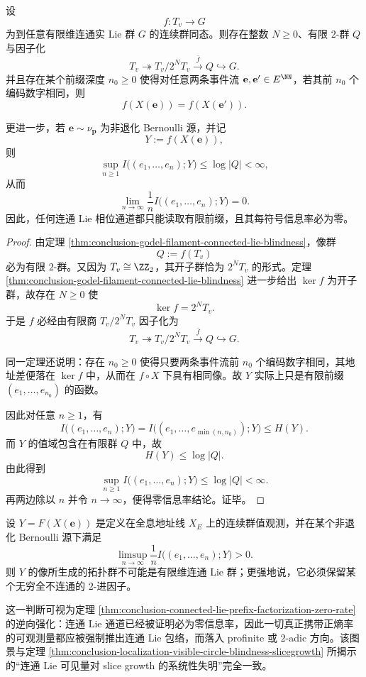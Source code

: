 \begin{theorem}\label{thm:conclusion-connected-lie-prefix-factorization-zero-rate}
设
\[
f:T_v\longrightarrow G
\]
为到任意有限维连通实 Lie 群 \(G\) 的连续群同态。则存在整数 \(N\ge 0\)、有限 \(2\)-群 \(Q\) 与因子化
\[
T_v\twoheadrightarrow T_v/2^N T_v\xrightarrow{\ \bar f\ } Q\hookrightarrow G.
\]
并且存在某个前缀深度 \(n_0\ge 0\) 使得对任意两条事件流 \(\mathbf e,\mathbf e'\in E^{\NN}\)，若其前 \(n_0\) 个编码数字相同，则
\[
f(X(\mathbf e))=f(X(\mathbf e')).
\]

更进一步，若 \(\mathbf e\sim \nu_{\mathbf p}\) 为非退化 Bernoulli 源，并记
\[
Y:=f(X(\mathbf e)),
\]
则
\[
\sup_{n\ge 1} I\bigl((e_1,\dots,e_n);Y\bigr)\le \log|Q|<\infty,
\]
从而
\[
\lim_{n\to\infty}\frac1n I\bigl((e_1,\dots,e_n);Y\bigr)=0.
\]
因此，任何连通 Lie 相位通道都只能读取有限前缀，且其每符号信息率必为零。
\end{theorem}
\begin{proof}
由定理 \ref{thm:conclusion-godel-filament-connected-lie-blindness}，像群
\[
Q:=f(T_v)
\]
必为有限 \(2\)-群。又因为 \(T_v\cong \ZZ_2\)，其开子群恰为 \(2^N T_v\) 的形式。定理 \ref{thm:conclusion-godel-filament-connected-lie-blindness} 进一步给出 \(\ker f\) 为开子群，故存在 \(N\ge 0\) 使
\[
\ker f=2^N T_v.
\]
于是 \(f\) 必经由有限商 \(T_v/2^N T_v\) 因子化为
\[
T_v\twoheadrightarrow T_v/2^N T_v\xrightarrow{\ \bar f\ } Q\hookrightarrow G.
\]

同一定理还说明：存在 \(n_0\ge 0\) 使得只要两条事件流前 \(n_0\) 个编码数字相同，其地址差便落在 \(\ker f\) 中，从而在 \(f\circ X\) 下具有相同像。故 \(Y\) 实际上只是有限前缀 \((e_1,\dots,e_{n_0})\) 的函数。

因此对任意 \(n\ge 1\)，有
\[
I\bigl((e_1,\dots,e_n);Y\bigr)
=
I\bigl((e_1,\dots,e_{\min(n,n_0)});Y\bigr)
\le
H(Y).
\]
而 \(Y\) 的值域包含在有限群 \(Q\) 中，故
\[
H(Y)\le \log|Q|.
\]
由此得到
\[
\sup_{n\ge 1}I\bigl((e_1,\dots,e_n);Y\bigr)\le \log|Q|<\infty.
\]
再两边除以 \(n\) 并令 \(n\to\infty\)，便得零信息率结论。证毕。
\end{proof}

\begin{conjecture}\label{conj:conclusion-positive-rate-observable-leaves-connected-lie}
设 \(Y=F(X(\mathbf e))\) 是定义在全息地址线 \(X_E\) 上的连续群值观测，并在某个非退化 Bernoulli 源下满足
\[
\limsup_{n\to\infty}\frac1n I\bigl((e_1,\dots,e_n);Y\bigr)>0.
\]
则 \(Y\) 的像所生成的拓扑群不可能是有限维连通 Lie 群；更强地说，它必须保留某个无穷全不连通的 \(2\)-进因子。

这一判断可视为定理 \ref{thm:conclusion-connected-lie-prefix-factorization-zero-rate} 的逆向强化：连通 Lie 通道已经被证明必为零信息率，因此一切真正携带正熵率的可观测量都应被强制推出连通 Lie 包络，而落入 profinite 或 \(2\)-adic 方向。该图景与定理 \ref{thm:conclusion-localization-visible-circle-blindness-slicegrowth} 所揭示的“连通 Lie 可见量对 slice growth 的系统性失明”完全一致。
\end{conjecture}

